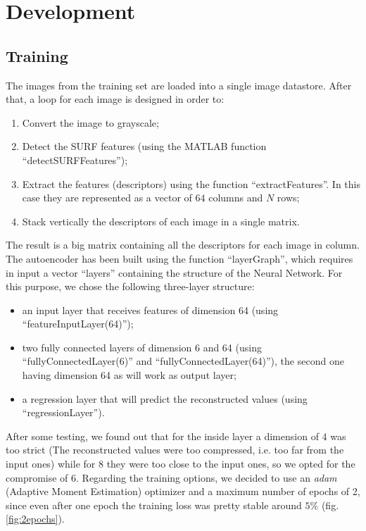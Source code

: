 
\section{Development}
\subsection{Training}
The images from the training set are loaded into a single image datastore. After that, a loop for each image is designed in order to:
\begin{enumerate}
\item Convert the image to grayscale;
\item Detect the SURF features (using the MATLAB function ``detectSURFFeatures'');
\item Extract the features (descriptors) using the function ``extractFeatures''. In this case they are represented as a vector of $64$ columns and $N$ rows;
\item Stack vertically the descriptors of each image in a single matrix.
\end{enumerate}
The result is a big matrix containing all the descriptors for each image in column. The autoencoder has been built using the function ``layerGraph'', which requires in input a vector ``layers'' containing the structure of the Neural Network. For this purpose, we chose the following three-layer structure:
\begin{itemize}
\item an input layer that receives features of dimension 64 (using \\ ``featureInputLayer(64)'');
\item two fully connected layers of dimension 6 and 64 (using ``fullyConnectedLayer(6)'' and ``fullyConnectedLayer(64)''), the second one having dimension 64 as will work as output layer;
\item a regression layer that will predict the reconstructed values (using \\ ``regressionLayer'').
\end{itemize}
After some testing, we found out that for the inside layer a dimension of $4$ was too strict (The reconstructed values were too compressed, i.e. too far from the input ones) while for $8$ they were too close to the input ones, so we opted for the compromise of $6$.
Regarding the training options, we decided to use an \emph{adam} (Adaptive Moment Estimation) optimizer and a maximum number of epochs of 2, since even after one epoch the training loss was pretty stable around $5\%$ (fig. \ref{fig:2epochs}).

